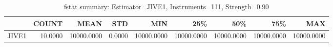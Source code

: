 \begin{table}[ht]
\centering
\caption{fstat summary: Estimator=JIVE1, Instruments=111, Strength=0.90}
\begin{tabular}{lrrrrrrrr}
\toprule
 & COUNT & MEAN & STD & MIN & 25\% & 50\% & 75\% & MAX \\
\midrule
JIVE1 & 10.0000 & 10000.0000 & 0.0000 & 10000.0000 & 10000.0000 & 10000.0000 & 10000.0000 & 10000.0000 \\
\bottomrule
\end{tabular}
\end{table}
